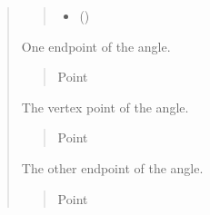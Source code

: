 \documentclass[letterpaper,10pt,english]{sphinxmanual}
\begin{document}
\begin{quote}
\begin{fulllineitems}
\begin{quote}
\begin{description}
\begin{itemize}
\item {} 
\sphinxAtStartPar
{} (\sphinxstyleliteralemphasis{\sphinxupquote{ | }})

\end{itemize}

\end{description}\end{quote}

\begin{fulllineitems}
\label{\detokenize{pygeox:pygeox.basic_objects.Angle.A}}
\pysigstartsignatures
\pysigline
{}
\pysigstopsignatures
\sphinxAtStartPar
One endpoint of the angle.
\begin{quote}\begin{description}
\sphinxAtStartPar
Point

\end{description}\end{quote}

\end{fulllineitems}


\begin{fulllineitems}
\label{\detokenize{pygeox:pygeox.basic_objects.Angle.vertex}}
\pysigstartsignatures
\pysigline
{}
\pysigstopsignatures
\sphinxAtStartPar
The vertex point of the angle.
\begin{quote}\begin{description}
\sphinxAtStartPar
Point

\end{description}\end{quote}

\end{fulllineitems}


\begin{fulllineitems}
\label{\detokenize{pygeox:pygeox.basic_objects.Angle.B}}
\pysigstartsignatures
\pysigline
{}
\pysigstopsignatures
\sphinxAtStartPar
The other endpoint of the angle.
\begin{quote}\begin{description}
\sphinxAtStartPar
Point


\end{description}
\end{quote}
\end{fulllineitems}
\end{fulllineitems}
\end{quote}
\end{document}
